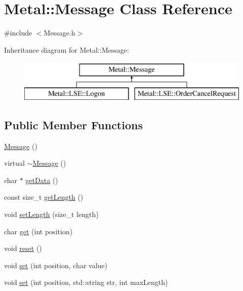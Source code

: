\hypertarget{classMetal_1_1Message}{}\section{Metal\+:\+:Message Class Reference}
\label{classMetal_1_1Message}


{\ttfamily \#include $<$Message.\+h$>$}

Inheritance diagram for Metal\+:\+:Message\+:\begin{figure}[H]
\begin{center}
\leavevmode
\includegraphics[height=2.000000cm]{classMetal_1_1Message}
\end{center}
\end{figure}
\subsection*{Public Member Functions}
\begin{DoxyCompactItemize}
\item 
\hyperlink{classMetal_1_1Message_a21fcdea056dd410289c7cef6daf876f5}{Message} ()
\item 
virtual \hyperlink{classMetal_1_1Message_a4c7f8e4a8dd99d69c3f29688b1fc820b}{$\sim$\+Message} ()
\item 
char $\ast$ \hyperlink{classMetal_1_1Message_aa662a9e07a4b0d47ab4a785bee70fa8d}{get\+Data} ()
\item 
const size\+\_\+t \hyperlink{classMetal_1_1Message_a22984c81035306cfde91a575ac19d32a}{get\+Length} ()
\item 
void \hyperlink{classMetal_1_1Message_ae8b03ceaf25a8bd6715772ecf0ba7b0a}{set\+Length} (size\+\_\+t length)
\item 
char \hyperlink{classMetal_1_1Message_aa14725bc08c942aa37e49d358f19dd79}{get} (int position)
\item 
void \hyperlink{classMetal_1_1Message_a39c87aec7a5302ff3d24cca76ac692d5}{reset} ()
\item 
void \hyperlink{classMetal_1_1Message_a9f9b7fb98dbe697d9cf7ad394fd45a2e}{set} (int position, char value)
\item 
void \hyperlink{classMetal_1_1Message_a7cb33179723ecc8a05860a97d9a518e3}{set} (int position, std\+::string str, int max\+Length)
\end{DoxyCompactItemize}
